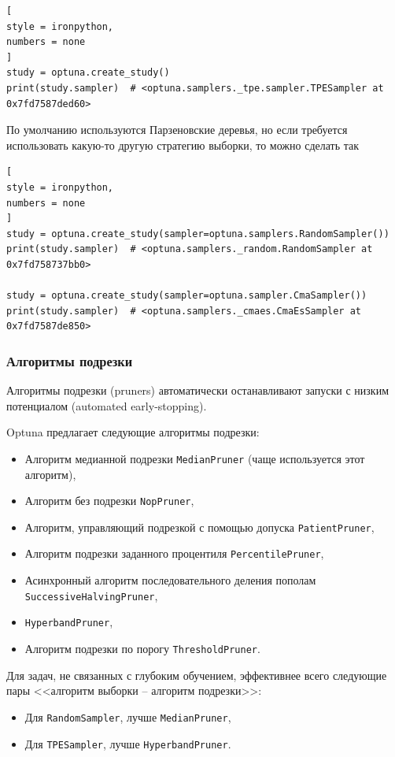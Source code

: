 \documentclass[%
	11pt,
	a4paper,
	utf8,
		]{article}
\begin{document}
\begin{lstlisting}[
style = ironpython,
numbers = none
]
study = optuna.create_study()
print(study.sampler)  # <optuna.samplers._tpe.sampler.TPESampler at 0x7fd7587ded60>
\end{lstlisting}

По умолчанию используются Парзеновские деревья, но если требуется использовать какую-то другую стратегию выборки, то можно сделать так
\begin{lstlisting}[
style = ironpython,
numbers = none
]
study = optuna.create_study(sampler=optuna.samplers.RandomSampler())
print(study.sampler)  # <optuna.samplers._random.RandomSampler at 0x7fd758737bb0>

study = optuna.create_study(sampler=optuna.sampler.CmaSampler())
print(study.sampler)  # <optuna.samplers._cmaes.CmaEsSampler at 0x7fd7587de850>
\end{lstlisting}

\subsubsection{Алгоритмы подрезки}

Алгоритмы подрезки (pruners) автоматически останавливают запуски с низким потенциалом (automated early-stopping).

Optuna предлагает следующие алгоритмы подрезки:
\begin{itemize}
	\item Алгоритм медианной подрезки \verb|MedianPruner| (чаще используется этот алгоритм),
	
	\item Алгоритм без подрезки \verb|NopPruner|,
	
	\item Алгоритм, управляющий подрезкой с помощью допуска \verb|PatientPruner|,
	
	\item Алгоритм подрезки заданного процентиля \verb|PercentilePruner|,
	
	\item Асинхронный алгоритм последовательного деления пополам \verb|SuccessiveHalvingPruner|,
	
	\item \verb|HyperbandPruner|,
	
	\item Алгоритм подрезки по порогу \verb|ThresholdPruner|.
\end{itemize}

Для задач, не связанных с глубоким обучением, эффективнее всего следующие пары <<алгоритм выборки -- алгоритм подрезки>>:
\begin{itemize}
	\item Для \verb|RandomSampler|, лучше \verb|MedianPruner|,
	
	\item Для \verb|TPESampler|, лучше \verb|HyperbandPruner|.
\end{itemize}
\end{document}
